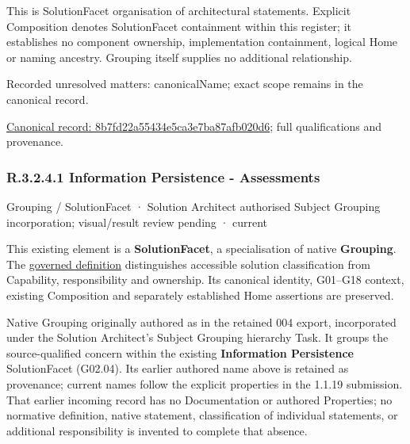 This is SolutionFacet organisation of architectural statements. Explicit Composition denotes SolutionFacet containment within this register; it establishes no component ownership, implementation containment, logical Home or naming ancestry. Grouping itself supplies no additional relationship.


{\small Recorded unresolved matters: canonicalName; exact scope remains in the canonical record.}\par
{\footnotesize \href{../../../../../../../continuum/grouping/8b7fd22a55434e5ca3e7ba87afb020d6.md}{Canonical record: 8b7fd22a55434e5ca3e7ba87afb020d6}; full qualifications and provenance.}\par
\subsubsection*{R.3.2.4.1 Information Persistence - Assessments}
\label{navigation:R.3.2.4.1}

\label{element:d733a698d2c4477db4a4289144417e3f}
{\small Grouping / SolutionFacet · Solution Architect authorised Subject Grouping incorporation; visual/result review pending · current}\par

This existing element is a \textbf{SolutionFacet}, a specialisation of native
\textbf{Grouping}. The \href{\detokenize{../../../../../../../governance/continuum-representation.md#solutionfacet-classification--1119-candidate}}{governed definition}
distinguishes accessible solution classification from Capability, responsibility
and ownership. Its canonical identity, G01–G18 context, existing Composition
and separately established Home assertions are preserved.



Native Grouping originally authored as \texttt{} in the retained 004 export,
incorporated under the Solution Architect's Subject Grouping hierarchy Task.
It groups the source-qualified \texttt{} concern within
the existing \textbf{Information Persistence} SolutionFacet (G02.04). Its earlier authored name above is retained as provenance; current names
follow the explicit properties in the 1.1.19 submission.
That earlier incoming record has no Documentation or authored Properties; no normative
definition, native statement, classification of individual statements, or
additional responsibility is invented to complete that absence.



